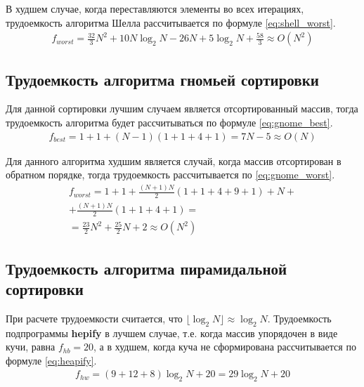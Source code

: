 В худшем случае, когда переставляются элементы во всех итерациях, трудоемкость алгоритма Шелла рассчитывается по формуле \eqref{eq:shell_worst}.
\begin{equation}
	\label{eq:shell_worst}
	\begin{gathered}
		f_{worst} = \frac{32}{3}N^2 + 10 N \log_{2}N - 26 N + 5 \log_{2}N + \frac{58}{3} \approx O(N^2)
	\end{gathered}
\end{equation}

\subsection{Трудоемкость алгоритма гномьей сортировки}

Для данной сортировки лучшим случаем является отсортированный массив, тогда трудоемкость алгоритма будет рассчитываться по формуле \eqref{eq:gnome_best}.
\begin{equation}
	\label{eq:gnome_best}
	\begin{gathered}
		f_{best} = 1 + 1 + (N - 1)(1 + 1 + 4 + 1) = 7 N - 5 \approx O(N)
	\end{gathered}
\end{equation}

Для данного алгоритма худшим является случай, когда массив отсортирован в обратном порядке, тогда трудоемкость рассчитывается по \eqref{eq:gnome_worst}.
\begin{equation}
	\label{eq:gnome_worst}
	\begin{gathered}
		f_{worst} = 1 + 1 + \frac{(N + 1)N}{2}(1 + 1 + 4 + 9 + 1) + N + \\
		+ \frac{(N + 1)N}{2}(1 + 1 + 4 + 1) = 
		\\ = \frac{23}{2} N^2 + \frac{25}{2}N + 2 \approx O(N^2)
	\end{gathered}
\end{equation}

\subsection{Трудоемкость алгоритма пирамидальной сортировки}
При расчете трудоемкости считается, что $\lfloor \log_{2}N \rfloor \approx \log_{2}N$.
Трудоемкость подпрограммы \textbf{hepify} в лучшем случае, т.е. когда массив упорядочен в виде кучи, равна $f_{hb} = 20$, а в худшем, когда куча не сформирована рассчитывается по формуле \eqref{eq:heapify}.
\begin{equation}
	\label{eq:heapify}
	\begin{gathered}
		f_{hw} = (9 + 12 + 8) \log_{2}N + 20 = 29 \log_{2}N + 20
	\end{gathered}
\end{equation}

